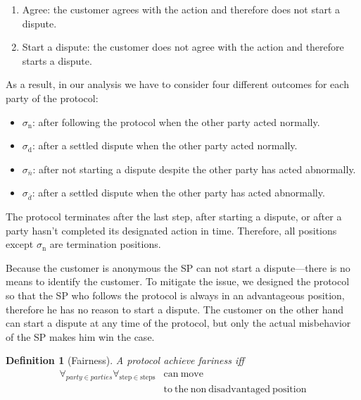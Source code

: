 \documentclass{ieeeaccess}
\newtheorem{definition}{Definition}
\begin{document}
\begin{enumerate}
\def\labelenumi{\arabic{enumi}.}

\item
  Agree: the customer agrees with the action and therefore does not start a dispute.
\item
  Start a dispute: the customer does not agree with the action and therefore starts a dispute.
\end{enumerate}

As a result, in our analysis we have to consider four different outcomes for each party of the protocol:

\begin{itemize}

\item
  $\sigma_\mathrm{n}$: after following the protocol when the other party acted normally.
\item
  $\sigma_\mathrm{d}$: after a settled dispute when the other party acted normally.
\item
  $\sigma_\overline{n}$: after not starting a dispute despite the other party has acted abnormally.
\item
  $\sigma_\overline{d}$: after a settled dispute when the other party has acted abnormally.
\end{itemize}

The protocol terminates after the last step, after starting a dispute, or after a party hasn't completed its designated action in time. Therefore, all positions except $\sigma_\mathrm{n}$ are termination positions.

Because the customer is anonymous the SP can not start a dispute---there is no means to identify the customer. To mitigate the issue, we designed the protocol so that the SP who follows the protocol is always in an advantageous position, therefore he has no reason to start a dispute. The customer on the other hand can start a dispute at any time of the protocol, but only the actual misbehavior of the SP makes him win the case.

\begin{definition}[Fairness] \label{fairness}
A protocol achieve fariness iff 
\begin{equation*}
\begin{split}
\forall_{party \in parties}\forall_{\mathrm{step} \in \mathrm{steps}} &\mathrm{can\ move}\\
&\mathrm{to\ the\ non\ disadvantaged\ position} 
\end{split}
\end{equation*}

\end{definition}
\end{document}
